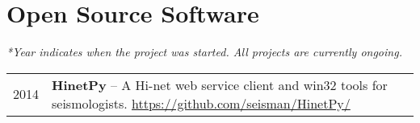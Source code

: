 \section*{Open Source Software}

\textit{*Year indicates when the project was started. All projects are currently ongoing.}

\begin{tabular}{p{} p{}}
2014 & \textbf{HinetPy} -- A Hi-net web service client and win32 tools for seismologists. \newline
       \url{https://github.com/seisman/HinetPy/} \\
\end{tabular}
